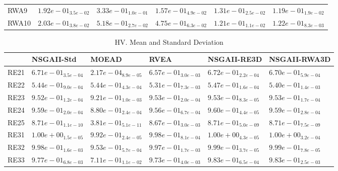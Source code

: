 \documentclass{article}
\begin{document}
\begin{table}
\begin{scriptsize}
\begin{tabular}{llllll}
RWA9 & $  1.92e-01_{ 3.5e-02}$ & $  3.33e-01_{ 1.0e-01}$ & $  1.57e-01_{ 4.9e-02}$ & \cellcolor{gray25}$  1.31e-01_{ 2.5e-02}$ & \cellcolor{gray95}$  1.19e-01_{ 1.9e-02}$ \\
RWA10 & $  2.03e-01_{ 3.8e-02}$ & $  5.18e-01_{ 2.7e-02}$ & $  4.75e-01_{ 6.3e-02}$ & \cellcolor{gray95}$  1.21e-01_{ 1.1e-02}$ & \cellcolor{gray25}$  1.22e-01_{ 8.3e-03}$ \\
\hline
\end{tabular}
\end{scriptsize}
\end{table}

\begin{table}
\caption{HV. Mean and Standard Deviation}
\label{table: HV}
\centering
\begin{scriptsize}
\begin{tabular}{llllll}
\hline & NSGAII-Std & MOEAD & RVEA & NSGAII-RE3D &  NSGAII-RWA3D\\
\hline 
RE21 & \cellcolor{gray25}$  6.71e-01_{ 3.5e-04}$ & $  2.17e-04_{ 8.9e-05}$ & $  6.57e-01_{ 3.0e-03}$ & \cellcolor{gray95}$  6.72e-01_{ 2.2e-04}$ & $  6.70e-01_{ 5.9e-04}$ \\
RE22 & $  5.44e-01_{ 9.0e-04}$ & \cellcolor{gray25}$  5.44e-01_{ 4.3e-04}$ & $  5.31e-01_{ 7.3e-03}$ & \cellcolor{gray95}$  5.47e-01_{ 1.6e-04}$ & $  5.40e-01_{ 1.4e-03}$ \\
RE23 & $  9.52e-01_{ 1.2e-04}$ & $  9.21e-01_{ 1.0e-03}$ & \cellcolor{gray95}$  9.53e-01_{ 2.0e-04}$ & \cellcolor{gray25}$  9.53e-01_{ 8.3e-05}$ & $  9.53e-01_{ 1.7e-04}$ \\
RE24 & $  9.59e-01_{ 2.0e-04}$ & $  8.80e-01_{ 2.4e-04}$ & $  9.56e-01_{ 6.7e-04}$ & \cellcolor{gray95}$  9.60e-01_{ 4.4e-05}$ & \cellcolor{gray25}$  9.59e-01_{ 2.8e-04}$ \\
RE25 & \cellcolor{gray95}$  8.71e-01_{ 1.1e-10}$ & $  3.81e-01_{ 5.1e-11}$ & $  8.67e-01_{ 3.0e-03}$ & \cellcolor{gray25}$  8.71e-01_{ 5.0e-09}$ & $  8.71e-01_{ 7.5e-09}$ \\
RE31 & \cellcolor{gray95}$  1.00e+00_{ 1.5e-05}$ & $  9.92e-01_{ 2.4e-05}$ & $  9.98e-01_{ 8.1e-04}$ & \cellcolor{gray25}$  1.00e+00_{ 4.3e-05}$ & $  1.00e+00_{ 3.2e-04}$ \\
RE32 & $  9.98e-01_{ 1.6e-03}$ & $  9.53e-01_{ 5.7e-04}$ & $  9.97e-01_{ 1.7e-03}$ & \cellcolor{gray95}$  9.99e-01_{ 3.7e-05}$ & \cellcolor{gray25}$  9.99e-01_{ 7.8e-05}$ \\
RE33 & $  9.77e-01_{ 6.8e-03}$ & $  7.11e-01_{ 1.1e-02}$ & $  9.73e-01_{ 4.0e-03}$ & \cellcolor{gray95}$  9.83e-01_{ 6.5e-04}$ & \cellcolor{gray25}$  9.83e-01_{ 2.5e-03}$ \\

\end{tabular}
\end{scriptsize}
\end{table}
\end{document}
